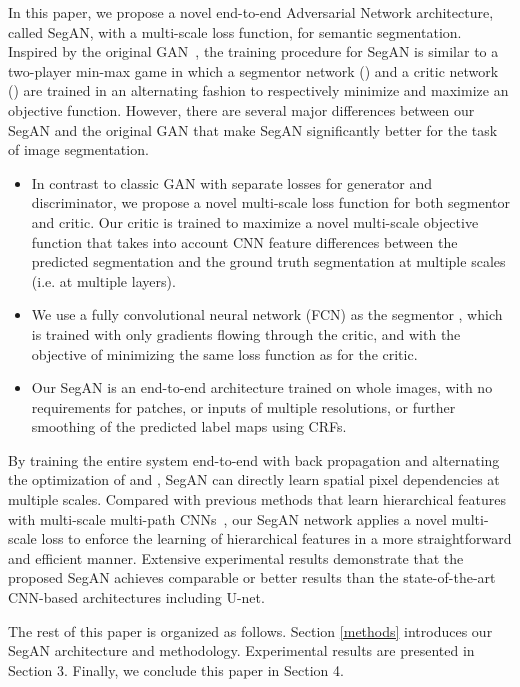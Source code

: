 \documentclass[twocolumn]{svjour3}
\begin{document}
In this paper, we propose a novel end-to-end Adversarial Network architecture, called SegAN, with a multi-scale  loss function, for semantic segmentation. Inspired by the original GAN~\cite{goodfellow2014generative}, the training procedure for SegAN is similar to a two-player min-max game in which a segmentor network () and a critic network () are trained in an alternating fashion to respectively minimize and maximize an objective function. However, there are several major differences between our SegAN and the original GAN that make SegAN significantly better for the task of image segmentation.
\begin{itemize}
\vspace{-6pt}
\item
In contrast to classic GAN with separate losses for generator and discriminator, we propose a novel multi-scale loss function for both segmentor and critic.
Our critic is trained to maximize a novel multi-scale  objective function that takes into account CNN feature differences between the predicted segmentation and the ground truth segmentation at multiple scales (i.e. at multiple layers).
\item We use a fully convolutional neural network (FCN) as the segmentor , which is trained with only gradients flowing through the critic, and with the objective of minimizing the same loss function as for the critic. \item Our SegAN is an end-to-end architecture trained on whole images, with no requirements for patches, or inputs of multiple resolutions, or further smoothing of the predicted label maps using CRFs.
\end{itemize}

By training the entire system end-to-end with back propagation and alternating the optimization of  and , SegAN can directly learn spatial pixel dependencies at multiple scales. Compared with previous methods that learn hierarchical features with multi-scale multi-path CNNs~\cite{farabet2013learning}, our SegAN network applies a novel multi-scale loss to enforce the learning of hierarchical features in a more straightforward and efficient manner.
Extensive experimental results demonstrate that the proposed SegAN achieves comparable or better results than the state-of-the-art CNN-based architectures including U-net.

The rest of this paper is organized as follows. Section \ref{methods} introduces our SegAN architecture and methodology. Experimental results are presented in Section 3. Finally, we conclude this paper in Section 4.
\end{document}
